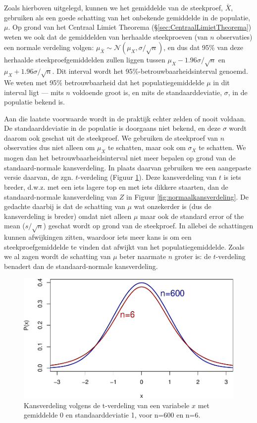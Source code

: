 \documentclass[
]{book}
\begin{document}
Zoals hierboven uitgelegd, kunnen we het gemiddelde van de steekproef,
\(\bar{X}\), gebruiken als een goede schatting van het onbekende
gemiddelde in de populatie, \(\mu\). Op grond van het Centraal Limiet
Theorema (§\ref{sec:CentraalLimietTheorema}) weten we ook dat de gemiddelden
van herhaalde steekproeven (van \(n\) observaties) een normale verdeling
volgen: \(\mu_{\bar{X}} \sim \mathcal{N}(\mu_{X},\sigma/\sqrt{n})\), en
dus dat 95\% van deze herhaalde steekproefgemiddelden zullen liggen
tussen \(\mu_{X}-1.96\sigma/\sqrt{n}\) en \(\mu_{X}+1.96\sigma/\sqrt{n}\).
Dit interval wordt het 95\%-betrouwbaarheidsinterval genoemd. We weten
met 95\% betrouwbaarheid dat het populatiegemiddelde \(\mu\) in dit
interval ligt --- mits \(n\) voldoende groot is, en mits de
standaarddeviatie, \(\sigma\), in de populatie bekend is.

Aan die laatste voorwaarde wordt in de praktijk echter zelden of nooit
voldaan. De standaarddeviatie in de populatie is doorgaans niet bekend,
en deze \(\sigma\) wordt daarom ook geschat uit de steekproef. We
gebruiken de steekproef van \(n\) observaties dus niet alleen om \(\mu_X\)
te schatten, maar ook om \(\sigma_X\) te schatten. We mogen dan het
betrouwbaarheidsinterval niet meer bepalen op grond van de
standaard-normale kansverdeling. In plaats daarvan gebruiken we een
aangepaste versie daarvan, de zgn. \(t\)-verdeling
(Figuur \ref{fig:tkansverdeling}). Deze kansverdeling van \(t\) is iets
breder, d.w.z. met een iets lagere top en met iets dikkere staarten, dan
de standaard-normale kansverdeling van \(Z\) in
Figuur \ref{fig:normaalkansverdeling}.
De gedachte daarbij is dat de
schatting van \(\mu\) wat onzekerder is (dus de kansverdeling is breder)
omdat niet alleen \(\mu\) maar ook de standard error of the mean
(\(s/\sqrt{n}\)) geschat wordt op grond van de steekproef. In allebei de
schattingen kunnen afwijkingen zitten, waardoor iets meer kans is om een
steekproefgemiddelde te vinden dat afwijkt van het populatiegemiddelde.
Zoals we al zagen wordt de schatting van \(\mu\) beter naarmate \(n\) groter
is: de \(t\)-verdeling benadert dan de standaard-normale kansverdeling.

\begin{figure}
\centering
\includegraphics{MS1NL-boek_files/figure-latex/tkansverdeling-1.pdf}
\caption{\label{fig:tkansverdeling}Kansverdeling volgens de t-verdeling van een variabele \(x\) met gemiddelde 0 en standaarddeviatie 1, voor n=600 en n=6.}
\end{figure}
\end{document}

